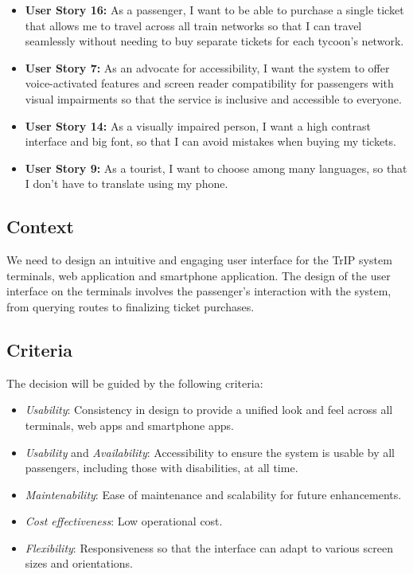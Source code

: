 \begin{itemize}
    \item \textbf{User Story 16:} As a passenger, I want to be able to purchase a single ticket that allows me to travel across all train networks so that I can travel seamlessly without needing to buy separate tickets for each tycoon's network.
    \item \textbf{User Story 7:} As an advocate for accessibility, I want the system to offer voice-activated features and screen reader compatibility for passengers with visual impairments so that the service is inclusive and accessible to everyone.
    \item \textbf{User Story 14:} As a visually impaired person, I want a high contrast interface and big font, so that I can avoid mistakes when buying my tickets.
    \item \textbf{User Story 9:} As a tourist, I want to choose among many languages, so that I don't have to translate using my phone.
\end{itemize}

\subsection*{Context}
We need to design an intuitive and engaging user interface for the TrIP system terminals, web application and smartphone application.
The design of the user interface on the terminals involves the passenger's interaction with the system, from querying routes to finalizing ticket purchases.

\subsection*{Criteria}
The decision will be guided by the following criteria:
\begin{itemize}
    \item \textit{Usability}: Consistency in design to provide a unified look and feel across all terminals, web apps and smartphone apps.
    \item \textit{Usability} and \textit{Availability}: Accessibility to ensure the system is usable by all passengers, including those with disabilities, at all time.
    \item \textit{Maintenability}: Ease of maintenance and scalability for future enhancements.
    \item \textit{Cost effectiveness}: Low operational cost.
    \item \textit{Flexibility}: Responsiveness so that the interface can adapt to various screen sizes and orientations.
\end{itemize}

